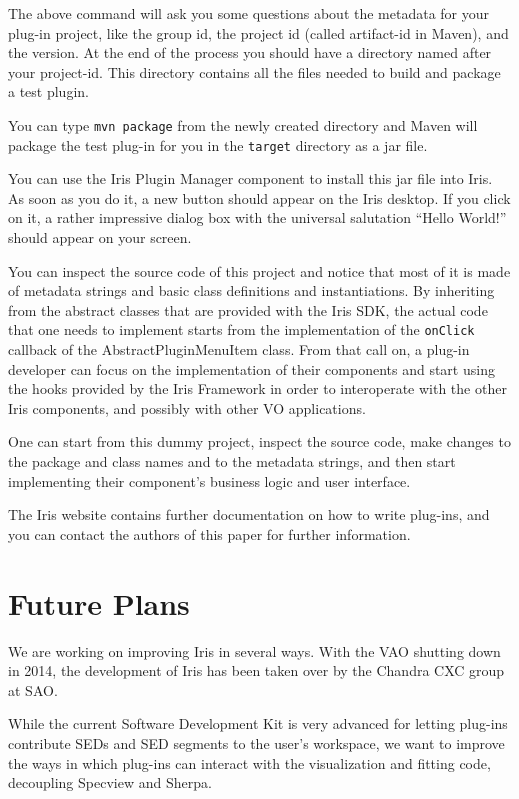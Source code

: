 \documentclass[final,5p]{elsarticle}
\begin{document}
The above command will ask you some questions about the metadata for your plug-in project, like the group id, the project id (called artifact-id in Maven), and the version. At the end of the process you should have a directory named after your project-id. This directory contains all the files needed to build and package a test plugin.

You can type \verb|mvn package| from the newly created directory and Maven will package the test plug-in for you in the \verb|target| directory as a jar file.

You can use the Iris Plugin Manager component to install this jar file into Iris. As soon as you do it, a new button should appear on the Iris desktop. If you click on it, a rather impressive dialog box with the universal salutation ``Hello World!'' should appear on your screen.

You can inspect the source code of this project and notice that most of it is made of metadata strings and basic class definitions and instantiations. By inheriting from the abstract classes that are provided with the Iris SDK, the actual code that one needs to implement starts from the implementation of the \verb|onClick| callback of the AbstractPluginMenuItem class. From that call on, a plug-in developer can focus on the implementation of their components and start using the hooks provided by the Iris Framework in order to interoperate with the other Iris components, and possibly with other VO applications.

One can start from this dummy project, inspect the source code, make changes to the package and class names and to the metadata strings, and then start implementing their component's business logic and user interface.

The Iris website contains further documentation on how to write plug-ins, and you can contact the authors of this paper for further information.

\section{Future Plans}
We are working on improving Iris in several ways. With the VAO shutting down in 2014, the development of Iris has been taken over by the Chandra CXC group at SAO.

While the current Software Development Kit is very advanced for letting plug-ins contribute SEDs and SED segments to the user's workspace, we want to improve the ways in which plug-ins can interact with the visualization and fitting code, decoupling Specview and Sherpa.
\end{document}
